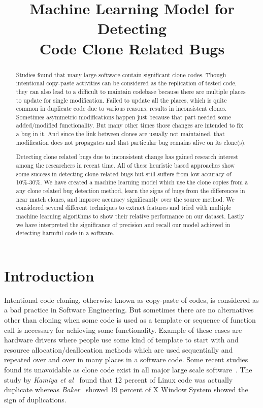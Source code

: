 \documentclass[nocopyrightspace]{sigplanconf}
\title{Machine Learning Model for Detecting \\Code Clone Related Bugs}
\date{}
\begin{document}
\maketitle

\begin{abstract}
Studies found that many large software contain significant clone codes. Though intentional copy-paste activities can be considered as the replication of tested code, they can also lead to a difficult to maintain codebase because there are multiple places to update for single modification. Failed to update all the places, which is quite common in duplicate code due to various reasons, results in inconsistent clones. Sometimes asymmetric modifications happen just because that part needed some added/modified functionality. But many other times those changes are intended to fix a bug in it. And since the link between clones are usually not maintained, that modification does not propagates and that particular bug remains alive on its clone(s).

\vspace{10 pt}
\noindent
Detecting clone related bugs due to inconsistent change has gained research interest among the researchers in recent time. All of these heuristic based approaches show some success in detecting clone related bugs but still suffers from low accuracy of 10\%-30\%. We have created a machine learning model which use the clone copies from a any clone related bug detection method, learn the signs of bugs from the differences in near match clones, and improve accuracy significantly over the source method. We considered several different techniques to extract features and tried with multiple machine learning algorithms to show their relative performance on our dataset. Lastly we have interpreted the significance of precision and recall our model achieved in detecting harmful code in a software.
\end{abstract}
			
\section{Introduction}
Intentional code cloning, otherwise known as copy-paste of codes, is considered as a bad practice in Software Engineering. But sometimes there are no alternatives other than cloning when some code is used as a template or sequence of function call is necessary for achieving some functionality. Example of these cases are hardware drivers where people use some kind of template to start with and resource allocation/deallocation methods which are used sequentially and repeated over and over in many places in a software code. Some recent studies found its unavoidable as clone code exist in all major large scale software~\cite{Li2006,Kamiya2002,Baker1995}. The study by \emph{Kamiya et al}~\cite{Kamiya2002} found that 12 percent of Linux code was actually duplicate whereas \emph{Baker}~\cite{Baker1995} showed 19 percent of X Window System showed the sign of duplications.
\end{document}
